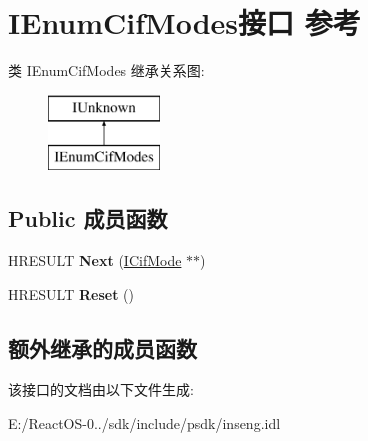 \hypertarget{interface_i_enum_cif_modes}{}\section{I\+Enum\+Cif\+Modes接口 参考}
\label{interface_i_enum_cif_modes}
类 I\+Enum\+Cif\+Modes 继承关系图\+:\begin{figure}[H]
\begin{center}
\leavevmode
\includegraphics[height=2.000000cm]{interface_i_enum_cif_modes}
\end{center}
\end{figure}
\subsection*{Public 成员函数}
\begin{DoxyCompactItemize}
\item 
\mbox{\label{interface_i_enum_cif_modes_a4833974ab664da9374f89c7c40912615}} 
H\+R\+E\+S\+U\+LT {\bfseries Next} (\hyperlink{interface_i_cif_mode}{I\+Cif\+Mode} $\ast$$\ast$)
\item 
\mbox{\label{interface_i_enum_cif_modes_ab7032f56a11fae0d6de377896e1e39a7}} 
H\+R\+E\+S\+U\+LT {\bfseries Reset} ()
\end{DoxyCompactItemize}
\subsection*{额外继承的成员函数}


该接口的文档由以下文件生成\+:\begin{DoxyCompactItemize}
\item 
E\+:/\+React\+O\+S-\/0../sdk/include/psdk/inseng.\+idl\end{DoxyCompactItemize}
